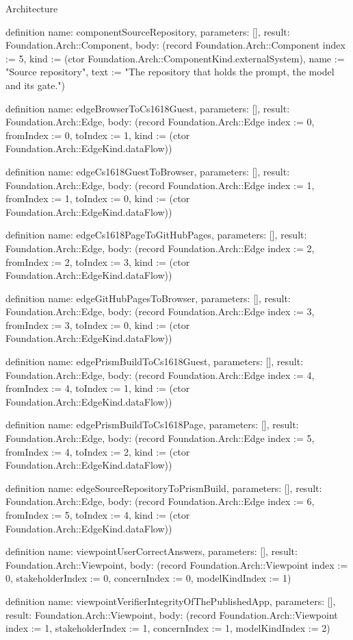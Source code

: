 \begin{lexlean}{Architecture}
\begin{semanticmodule}
definition{
  name: componentSourceRepository,
  parameters: [],
  result: Foundation.Arch::Component,
  body: (record Foundation.Arch::Component {index := 5, kind := (ctor Foundation.Arch::ComponentKind.externalSystem), name := "Source repository", text := "The repository that holds the prompt, the model and its gate."})
}

definition{
  name: edgeBrowserToCs1618Guest,
  parameters: [],
  result: Foundation.Arch::Edge,
  body: (record Foundation.Arch::Edge {index := 0, fromIndex := 0, toIndex := 1, kind := (ctor Foundation.Arch::EdgeKind.dataFlow)})
}

definition{
  name: edgeCs1618GuestToBrowser,
  parameters: [],
  result: Foundation.Arch::Edge,
  body: (record Foundation.Arch::Edge {index := 1, fromIndex := 1, toIndex := 0, kind := (ctor Foundation.Arch::EdgeKind.dataFlow)})
}

definition{
  name: edgeCs1618PageToGitHubPages,
  parameters: [],
  result: Foundation.Arch::Edge,
  body: (record Foundation.Arch::Edge {index := 2, fromIndex := 2, toIndex := 3, kind := (ctor Foundation.Arch::EdgeKind.dataFlow)})
}

definition{
  name: edgeGitHubPagesToBrowser,
  parameters: [],
  result: Foundation.Arch::Edge,
  body: (record Foundation.Arch::Edge {index := 3, fromIndex := 3, toIndex := 0, kind := (ctor Foundation.Arch::EdgeKind.dataFlow)})
}

definition{
  name: edgePrismBuildToCs1618Guest,
  parameters: [],
  result: Foundation.Arch::Edge,
  body: (record Foundation.Arch::Edge {index := 4, fromIndex := 4, toIndex := 1, kind := (ctor Foundation.Arch::EdgeKind.dataFlow)})
}

definition{
  name: edgePrismBuildToCs1618Page,
  parameters: [],
  result: Foundation.Arch::Edge,
  body: (record Foundation.Arch::Edge {index := 5, fromIndex := 4, toIndex := 2, kind := (ctor Foundation.Arch::EdgeKind.dataFlow)})
}

definition{
  name: edgeSourceRepositoryToPrismBuild,
  parameters: [],
  result: Foundation.Arch::Edge,
  body: (record Foundation.Arch::Edge {index := 6, fromIndex := 5, toIndex := 4, kind := (ctor Foundation.Arch::EdgeKind.dataFlow)})
}

definition{
  name: viewpointUserCorrectAnswers,
  parameters: [],
  result: Foundation.Arch::Viewpoint,
  body: (record Foundation.Arch::Viewpoint {index := 0, stakeholderIndex := 0, concernIndex := 0, modelKindIndex := 1})
}

definition{
  name: viewpointVerifierIntegrityOfThePublishedApp,
  parameters: [],
  result: Foundation.Arch::Viewpoint,
  body: (record Foundation.Arch::Viewpoint {index := 1, stakeholderIndex := 1, concernIndex := 1, modelKindIndex := 2})
}


\end{semanticmodule}
\end{lexlean}
